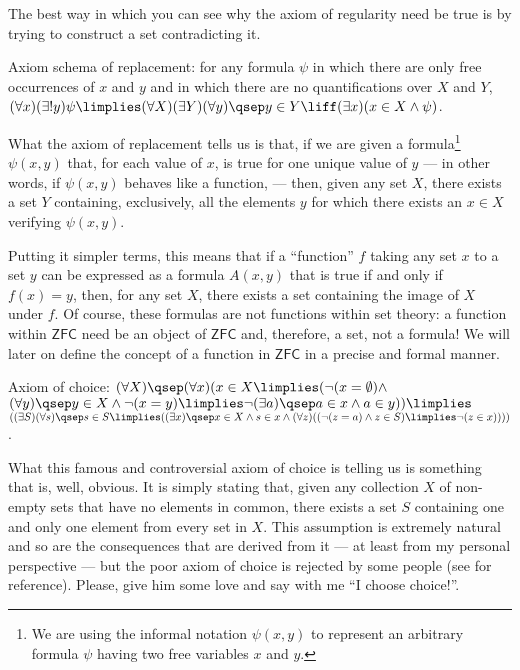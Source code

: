 \begin{para}
The best way in which you can see why the axiom of regularity need be true is by trying to construct a set contradicting it.

\begin{axioms}
\item \label{replacement} Axiom schema of replacement:
for any formula $\psi$ in which there are only free occurrences of $x$ and $y$ and in which there are no quantifications over $X$ and $Y$,
$(\forall x)(\exists! y) \psi \limplies (\forall X)(\exists Y)(\forall y)\qsep y\in Y \liff (\exists x)(x\in X \land \psi)$.
\end{axioms}
What the axiom of replacement tells us is that, if we are given a formula\footnote{We are using the informal notation $\psi(x,y)$ to represent an arbitrary formula $\psi$ having two free variables $x$ and $y$.} $\psi(x,y)$ that, for each value of $x$, is true for one unique value of $y$ --- in other words, if $\psi(x,y)$ behaves like a function, --- then, given any set $X$, there exists a set $Y$ containing, exclusively, all the elements $y$ for which there exists an $x\in X$ verifying $\psi(x,y)$.

Putting it simpler terms, this means that if a ``function'' $f$ taking any set $x$ to a set $y$ can be expressed as a formula $A(x,y)$ that is true if and only if $f(x) = y$, then, for any set $X$, there exists a set containing the image of $X$ under $f$.
Of course, these formulas are not functions within set theory: a function within $\mathsf{ZFC}$ need be an object of $\mathsf{ZFC}$ and, therefore, a set, not a formula!
We will later on define the concept of a function in $\mathsf{ZFC}$ in a precise and formal manner. 

\begin{axioms}
\item \label{choice} Axiom of choice: $(\forall X) \qsep (\forall x)(x\in X \limplies (\lnot(x = \emptyset) \land$\\
\hspace*{1em}$(\forall y)\qsep y \in X \land\lnot(x = y) \limplies \lnot(\exists a)\qsep a \in x \land a \in y))\limplies$\\
$((\exists S)(\forall s)\qsep s\in S \limplies ((\exists x)\qsep x\in X \land s \in x \land(\forall z)((\lnot (z=a)\land z\in S )\limplies \lnot (z \in x))))$.
\end{axioms}
What this famous and controversial axiom of choice is telling us is something that is, well, obvious.
It is simply stating that, given any collection $X$ of non-empty sets that have no elements in common, there exists a set $S$ containing one and only one element from every set in $X$.
This assumption is extremely natural and so are the consequences that are derived from it --- at least from my personal perspective --- but the poor axiom of choice is rejected by some people (see \cite{Brown} for reference).
Please, give him some love and say with me ``I choose choice!''.


\end{para}
